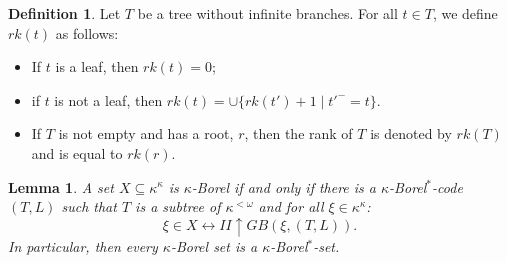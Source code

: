 \documentclass[12pt,a4paper]{amsart}
\newtheorem{lemma}[thm]{Lemma}
\theoremstyle{definition}
\newtheorem{defn}[thm]{Definition}
\theoremstyle{remark}
\renewcommand{\mid}{\mathrel{|}\allowbreak}
\def\borelstar{Borel\nobreak\hspace{1pt}$^*$}
\begin{document}
 \begin{defn}\label{rank_tree}
     Let $T$ be a tree without infinite branches. For all $t\in T$, we define $rk(t)$ as follows:
     \begin{itemize}
         \item If $t$ is a leaf, then $rk(t)=0$;
         \item if $t$ is not a leaf, then $rk(t)=\cup\{rk(t')+1\mid t'^-=t\}$.
         \item If $T$ is not empty and has a root, $r$, then the rank of $T$ is denoted by $rk(T)$ and is equal to $rk(r)$.
     \end{itemize}
 \end{defn}

    \begin{lemma}\label{Borel_is_Borel*}
        A set $X\subseteq \kappa^\kappa$ is  $\kappa$-Borel if and only if there is a  $\kappa$-\borelstar-code $(T,L)$  such that $T$ is a subtree of $\kappa^{<\omega}$ and for all $\xi\in\kappa^\kappa$: 
$$\xi\in X\leftrightarrow II\uparrow GB(\xi,(T,L)).$$
    In particular, then every $\kappa$-Borel set is a $\kappa$-\borelstar-set.
    \end{lemma}
    
\end{document}
